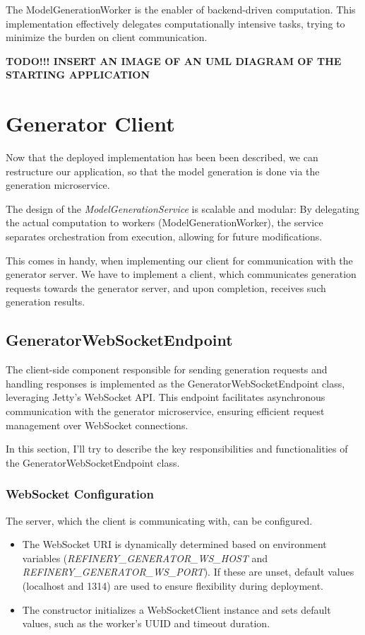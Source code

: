			The ModelGenerationWorker is the enabler of backend-driven computation.
			This implementation effectively delegates computationally intensive tasks, trying to minimize 
			the burden on client communication.

		\textbf{TODO!!! INSERT AN IMAGE OF AN UML DIAGRAM OF THE STARTING APPLICATION}

	\section{Generator Client}
			Now that the deployed implementation has been been described, we can restructure our application, so that the 
			model generation is done via the generation microservice.

			The design of the \textit{ModelGenerationService} is scalable and modular:
			By delegating the actual computation to workers (ModelGenerationWorker), the service separates orchestration from execution, 
			allowing for future modifications. 
			
			This comes in handy, when implementing our client for communication with
			the generator server. We have to implement a client, which communicates generation requests towards the generator server,
			and upon completion, receives such generation results.

			\subsection{GeneratorWebSocketEndpoint}
			The client-side component responsible for sending generation requests and handling responses is implemented as the GeneratorWebSocketEndpoint class,
			leveraging Jetty's WebSocket API. This endpoint facilitates asynchronous communication with the generator microservice, 
			ensuring efficient request management over WebSocket connections. 

			In this section, I'll try to describe the key responsibilities and functionalities of the GeneratorWebSocketEndpoint class.
			\subsubsection{WebSocket Configuration} 
				The server, which the client is communicating with, can be configured.
				\begin{itemize}
					\item The WebSocket URI is dynamically determined based on environment variables (\textit{REFINERY\_GENERATOR\_WS\_HOST} 
					and \textit{REFINERY\_GENERATOR\_WS\_PORT}). If these are unset, default values (localhost and 1314) are used to ensure flexibility during deployment.
					\item The constructor initializes a WebSocketClient instance and sets default values, such as the worker's UUID and timeout duration.
				\end{itemize} 
